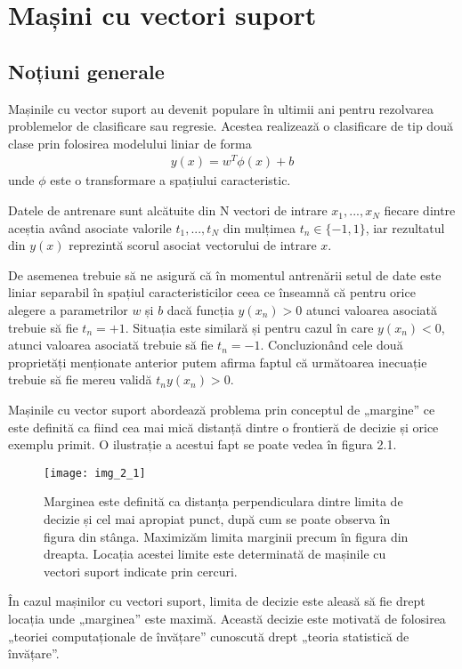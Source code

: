 \section{Mașini cu vectori suport}

\subsection{Noțiuni generale}

Mașinile cu vector suport au devenit populare în ultimii ani pentru rezolvarea problemelor de clasificare sau regresie. Acestea realizează o clasificare de tip două clase prin folosirea modelului liniar de forma
\begin{align}
	y(x) = w^T\phi(x) + b
\end{align}
unde $\phi$ este o transformare a spațiului caracteristic.

Datele de antrenare sunt alcătuite din N vectori de intrare $x_1, ...,x_N$ fiecare dintre aceștia având asociate valorile $t_1, ...,t_N$ din mulțimea $t_n \in \{-1,1\}$, iar rezultatul din $y(x)$ reprezintă scorul asociat vectorului de intrare $x$.

De asemenea trebuie să ne asigură că în momentul antrenării setul de date este liniar separabil în spațiul caracteristicilor ceea ce înseamnă că pentru orice alegere a parametrilor $w$ și $b$ dacă funcția $y(x_n) > 0$ atunci valoarea asociată trebuie să fie $t_n = +1$. Situația este similară și pentru cazul în care $y(x_n ) < 0$, atunci valoarea asociată trebuie să fie $t_n = -1$. 
Concluzionând cele două proprietăți menționate anterior putem afirma faptul că următoarea inecuație trebuie să fie mereu validă  $t_n y(x_n) > 0$. 

Mașinile cu vector suport abordează problema prin conceptul de „margine” ce este definită ca fiind cea mai mică distanță dintre o frontieră de decizie și orice exemplu primit. O ilustrație a acestui fapt se poate vedea în figura 2.1.
\begin{figure}[!h]
	\centering
	\texttt{[image: img\_2\_1]}
	\caption[Vectori suport mașină]{Marginea este definită ca distanța perpendiculara dintre limita de decizie și cel mai apropiat punct, după cum se poate observa în figura din stânga. Maximizăm limita marginii precum în figura din dreapta. Locația acestei limite este determinată de mașinile cu vectori suport indicate prin cercuri.}
\end{figure} 

În cazul mașinilor cu vectori suport, limita de decizie este aleasă să fie drept locația unde „marginea” este maximă. Această decizie este motivată de folosirea „teoriei computaționale de învățare” cunoscută drept „teoria statistică de învățare”. 

